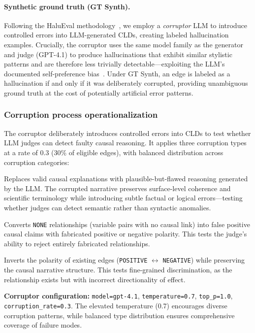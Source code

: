 \paragraph{Synthetic ground truth (GT Synth).} Following the HaluEval methodology~\citep{li2023haluevallargescalehallucinationevaluation}, we employ a \emph{corruptor} LLM to introduce controlled errors into LLM-generated CLDs, creating labeled hallucination examples. Crucially, the corruptor uses the same model family as the generator and judge (GPT-4.1) to produce hallucinations that exhibit similar stylistic patterns and are therefore less trivially detectable---exploiting the LLM's documented self-preference bias~\citep{zheng2024judging}. Under GT Synth, an edge is labeled as a hallucination if and only if it was deliberately corrupted, providing unambiguous ground truth at the cost of potentially artificial error patterns.

\subsubsection{Corruption process operationalization}

The corruptor deliberately introduces controlled errors into CLDs to test whether LLM judges can detect faulty causal reasoning. It applies three corruption types at a rate of 0.3 (30\% of eligible edges), with balanced distribution across corruption categories:

\begin{description}[leftmargin=1.5em, labelindent=0em]
    \item[Motivation corruption:] Replaces valid causal explanations with plausible-but-flawed reasoning generated by the LLM. The corrupted narrative preserves surface-level coherence and scientific terminology while introducing subtle factual or logical errors---testing whether judges can detect semantic rather than syntactic anomalies.
    \item[Spurious edge injection:] Converts \texttt{NONE} relationships (variable pairs with no causal link) into false positive causal claims with fabricated positive or negative polarity. This tests the judge's ability to reject entirely fabricated relationships.
    \item[Polarity flip:] Inverts the polarity of existing edges (\texttt{POSITIVE} $\leftrightarrow$ \texttt{NEGATIVE}) while preserving the causal narrative structure. This tests fine-grained discrimination, as the relationship exists but with incorrect directionality of effect.
\end{description}

\noindent
\textbf{Corruptor configuration:} \texttt{model=gpt-4.1}, \texttt{temperature=0.7}, \texttt{top\_p=1.0}, \texttt{corruption\_rate=0.3}. The elevated temperature (0.7) encourages diverse corruption patterns, while balanced type distribution ensures comprehensive coverage of failure modes.

